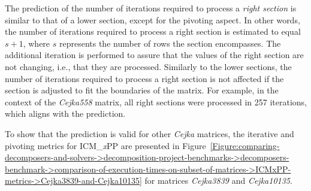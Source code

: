 The prediction of the number of iterations required to process a \textit{right section} is similar to that of a lower section, except for the pivoting aspect.
In other words, the number of iterations required to process a right section is estimated to equal $s + 1$, where $s$ represents the number of rows the section encompasses.
The additional iteration is performed to assure that the values of the right section are not changing, i.e., that they are processed.
Similarly to the lower sections, the number of iterations required to process a right section is not affected if the section is adjusted to fit the boundaries of the matrix.
For example, in the context of the \textit{Cejka558} matrix, all right sections were processed in 257 iterations, which aligns with the prediction.

To show that the prediction is valid for other \textit{Cejka} matrices, the iterative and pivoting metrics for ICM\_\textit{x}PP are presented in Figure~\ref{Figure:comparing-decomposers-and-solvers->decomposition-project-benchmarks->decomposers-benchmark->comparison-of-execution-times-on-subset-of-matrices->ICMxPP-metrics->Cejka3839-and-Cejka10135} for matrices \textit{Cejka3839} and \textit{Cejka10135}.

